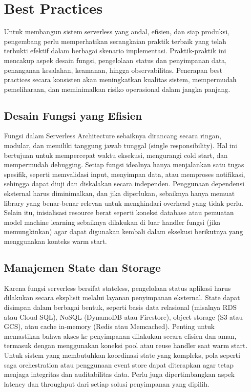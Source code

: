 \section{Best Practices}

Untuk membangun sistem serverless yang andal, efisien, dan siap produksi, pengembang perlu memperhatikan serangkaian praktik terbaik yang telah terbukti efektif dalam berbagai skenario implementasi. Praktik-praktik ini mencakup aspek desain fungsi, pengelolaan status dan penyimpanan data, penanganan kesalahan, keamanan, hingga observabilitas. Penerapan best practices secara konsisten akan meningkatkan kualitas sistem, mempermudah pemeliharaan, dan meminimalkan risiko operasional dalam jangka panjang.

\subsection{Desain Fungsi yang Efisien}

Fungsi dalam Serverless Architecture sebaiknya dirancang secara ringan, modular, dan memiliki tanggung jawab tunggal (single responsibility). Hal ini bertujuan untuk mempercepat waktu eksekusi, mengurangi cold start, dan mempermudah debugging. Setiap fungsi idealnya hanya menjalankan satu tugas spesifik, seperti memvalidasi input, menyimpan data, atau memproses notifikasi, sehingga dapat diuji dan diskalakan secara independen. Penggunaan dependensi eksternal harus diminimalkan, dan jika diperlukan, sebaiknya hanya memuat library yang benar-benar relevan untuk menghindari overhead yang tidak perlu. Selain itu, inisialisasi resource berat seperti koneksi database atau pemuatan model machine learning sebaiknya dilakukan di luar handler fungsi (jika memungkinkan) agar dapat digunakan kembali dalam eksekusi berikutnya yang menggunakan konteks warm start.

\subsection{Manajemen State dan Storage}

Karena fungsi serverless bersifat stateless, pengelolaan status aplikasi harus dilakukan secara eksplisit melalui layanan penyimpanan eksternal. State dapat disimpan dalam berbagai bentuk, seperti basis data relasional (misalnya RDS atau Cloud SQL), NoSQL (DynamoDB atau Firestore), object storage (S3 atau GCS), atau cache in-memory (Redis atau Memcached). Penting untuk memastikan bahwa akses ke penyimpanan dilakukan secara efisien dan aman, termasuk dengan menggunakan koneksi pool atau reuse handler saat warm start. Untuk sistem yang membutuhkan koordinasi state yang kompleks, pola seperti saga orchestration atau penggunaan event store dapat diterapkan agar tetap menjaga integritas dan auditabilitas data. Perlu juga dipertimbangkan aspek latency dan throughput dari setiap solusi penyimpanan yang dipilih.

